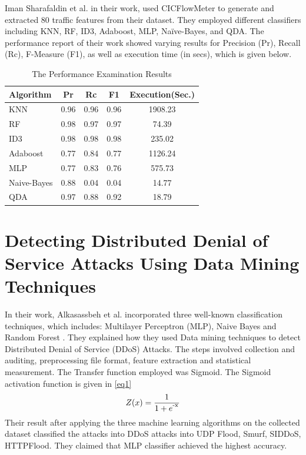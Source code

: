 \documentclass[conference]{IEEEtran}
\begin{document}
Iman Sharafaldin et al.\cite{sharalfaldin2018} in their work, used CICFlowMeter to generate and extracted 80 traffic features from their dataset. They employed different classifiers including KNN, RF, ID3, Adaboost, MLP, Naïve-Bayes, and QDA. The performance report of their work showed varying results for Precision (Pr), Recall (Rc), F-Measure (F1), as well as execution time (in secs), which is given below.
\begin{table}[bt]
\caption{The Performance Examination Results}
    \begin{center}
    \begin{tabular}{|l|c|c|c|c|} \hline
    \textbf{Algorithm} & \textbf{Pr}
    & \textbf{Rc} & \textbf{F1} & \textbf{Execution(Sec.)} \\ \hline
    {KNN} & {0.96} & {0.96} & {0.96} & {1908.23}\\
    {RF} & {0.98} & {0.97} & {0.97} & {74.39}\\
    {ID3} & {0.98} & {0.98} & {0.98} & {235.02}\\
    {Adaboost} & {0.77} & {0.84} & {0.77} & {1126.24}\\
    {MLP} & {0.77} & {0.83} & {0.76} & {575.73}\\
    {Naive-Bayes} & {0.88} & {0.04} & {0.04} & {14.77}\\
    {QDA} & {0.97} & {0.88} & {0.92} & {18.79}\\
    \hline
    \end{tabular}
    \end{center}
\end{table}
    
    
\section{Detecting Distributed Denial of Service Attacks Using Data Mining Techniques}
In their work, Alkasassbeh et al. incorporated three well-known classification techniques, which includes: Multilayer Perceptron (MLP), Naive Bayes and Random Forest \cite{Alkasassbeh2016}. They explained how they used Data mining techniques to detect Distributed Denial of Service (DDoS) Attacks. The steps involved collection and auditing, preprocessing file format, feature extraction and statistical measurement. The Transfer function employed was Sigmoid. The Sigmoid activation function is given in \eqref{eq1}
\begin{equation}
Z(x) = \frac{1}{1+e^\textsuperscript{-x}\label{eq1}}
\end{equation}
Their result after applying the three machine learning algorithms on the collected dataset classified the attacks into DDoS attacks into UDP Flood, Smurf, SIDDoS, HTTPFlood. They claimed that MLP classifier achieved the highest accuracy.
\end{document}
